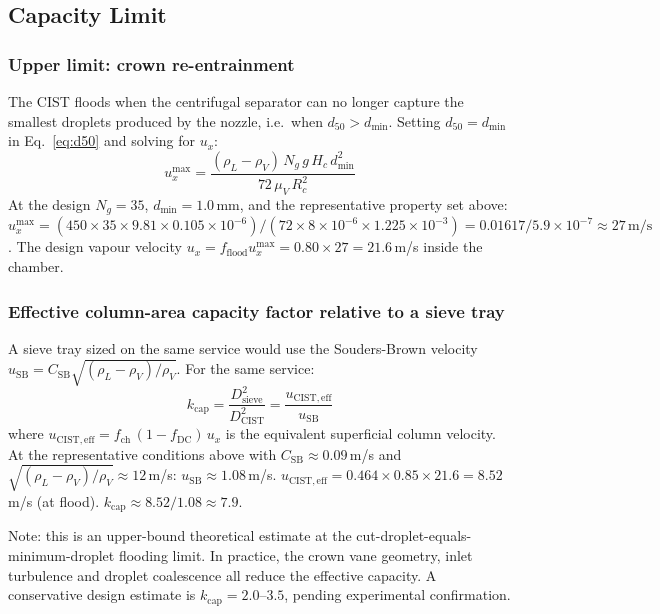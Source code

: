 \documentclass[11pt,letterpaper]{article}
\newcommand{\rhoL}{\rho_L}
\newcommand{\rhoV}{\rho_V}
\newcommand{\ux}{u_{x}}
\newcommand{\Rc}{R_c}
\newcommand{\Hc}{H_c}
\newcommand{\dmin}{d_{\min}}
\newcommand{\dcut}{d_{50}}
\newcommand{\Csb}{C_{\mathrm{SB}}}
\begin{document}
\subsection{Capacity Limit}
\label{sec:capacity}

\subsubsection{Upper limit: crown re-entrainment}

The CIST floods when the centrifugal separator can no longer capture the
smallest droplets produced by the nozzle, i.e.\ when $\dcut > \dmin$.
Setting $\dcut = \dmin$ in Eq.~\eqref{eq:d50} and solving for $\ux$:
\begin{equation}
  \ux^{\max} = \frac{(\rhoL-\rhoV)\,N_g\,g\,\Hc\,\dmin^2}
                    {72\,\mu_V\,\Rc^2}
  \label{eq:ux_max}
\end{equation}
At the design $N_g = 35$, $\dmin = 1.0$\,mm, and the representative
property set above:
$\ux^{\max} = (450\times35\times9.81\times0.105\times10^{-6})/(72\times8
\times10^{-6}\times1.225\times10^{-3}) = 0.01617/5.9\times10^{-7}
\approx 27\,\mathrm{m/s}$.
The design vapour velocity $\ux = f_{\mathrm{flood}}\ux^{\max}
= 0.80\times 27 = 21.6$\,m/s inside the chamber.

\subsubsection{Effective column-area capacity factor relative to a sieve tray}

A sieve tray sized on the same service would use the Souders-Brown velocity
$u_{\mathrm{SB}} = \Csb\sqrt{(\rhoL-\rhoV)/\rhoV}$.  For the same service:
\begin{equation}
  k_{\mathrm{cap}} = \frac{D_{\mathrm{sieve}}^2}{D_{\mathrm{CIST}}^2}
  = \frac{u_{\mathrm{CIST,eff}}}{u_{\mathrm{SB}}}
  \label{eq:kcap}
\end{equation}
where $u_{\mathrm{CIST,eff}} = f_{\mathrm{ch}}\,(1-f_{\mathrm{DC}})\,\ux$
is the equivalent superficial column velocity.  At the representative
conditions above with $\Csb \approx 0.09$\,m/s and
$\sqrt{(\rhoL-\rhoV)/\rhoV} \approx 12$\,m/s:
$u_{\mathrm{SB}} \approx 1.08$\,m/s.
$u_{\mathrm{CIST,eff}} = 0.464\times0.85\times21.6 = 8.52$\,m/s (at flood).
$k_{\mathrm{cap}} \approx 8.52/1.08 \approx 7.9$.

Note: this is an upper-bound theoretical estimate at the cut-droplet-equals-minimum-droplet flooding limit.  In practice, the crown vane geometry, inlet turbulence and droplet coalescence all reduce the effective capacity.  A conservative design estimate is $k_{\mathrm{cap}} = 2.0$--$3.5$, pending experimental confirmation.
\end{document}
